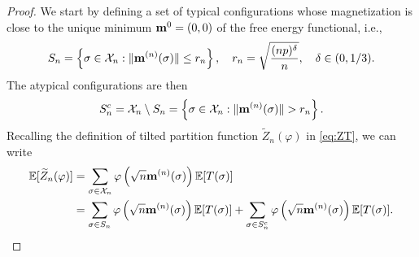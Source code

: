 \documentclass[11pt,oneside]{amsart}
\numberwithin{equation}{section}  %
\theoremstyle{plain}
\theoremstyle{remark}
\def \E {{\mathbb E}}
\def \bm {{\bf m}}
\begin{document}
\begin{proof}
We start by defining a set of typical configurations whose magnetization is close to the unique minimum $\bm^0=(0,0)$ of the free energy functional, i.e., 
\begin{equation}
\label{def:typ_rn}
S_n = \left\{ \sigma \in \mathcal{X}_n : \|\bm^{(n)}(\sigma)\| \le r_n \right\}, \quad 
r_n = \sqrt{\frac{(np)^{\delta}}{n}}, \quad \delta \in (0,1/3) .
\end{equation}
The atypical configurations are then
\[
S_n^c = \mathcal{X}_n \setminus S_n = \left\{ \sigma \in \mathcal{X}_n : \|\bm^{(n)}(\sigma)\| > r_n \right\}.
\]
Recalling the definition of tilted partition function $\widetilde{Z}_n(\varphi)$ in \eqref{eq:ZT}, we can write
\begin{equation}
\label{eq:typicalatypical}
\begin{split}
\E [ \widetilde{Z}_n(\varphi)] & = \sum_{\sigma \in \mathcal{X}_n} \varphi\left(\sqrt{n} \bm^{(n)}(\sigma) \right) \E[T(\sigma)] \\
& = \sum_{\sigma \in S_n} \varphi\left(\sqrt{n} \bm^{(n)}(\sigma) \right) \E[T(\sigma)] + \sum_{\sigma \in S_n^c} \varphi\left(\sqrt{n} \bm^{(n)}(\sigma) \right) \E[T(\sigma)].
\end{split}
\end{equation}


\end{proof}
\end{document}
